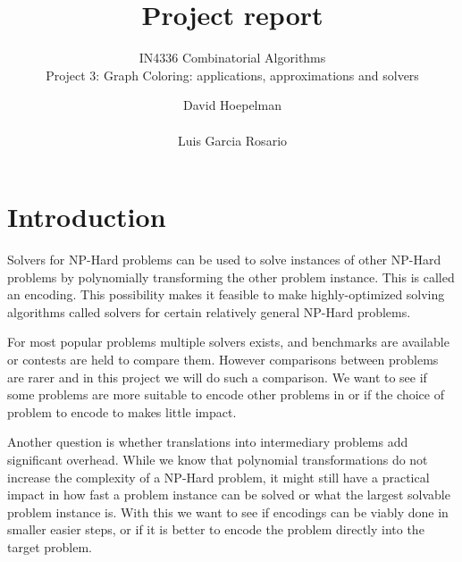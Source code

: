 \documentclass{sig-alternate}
\begin{document}
\title{Project report}

\subtitle{IN4336 Combinatorial Algorithms\\Project 3: Graph Coloring: applications, approximations and
solvers}


\author{
\alignauthor
David Hoepelman\\
       \\
\alignauthor
Luis Garcia Rosario\\
}

\maketitle


\begin{abstract}

\end{abstract}


\section{Introduction}

Solvers for NP-Hard problems can be used to solve instances of other NP-Hard problems by polynomially transforming the other problem instance. This is called an encoding.
This possibility makes it feasible to make highly-optimized solving algorithms called solvers for certain relatively general NP-Hard problems.

For most popular problems multiple solvers exists, and benchmarks are available or contests are held to compare them.
However comparisons between problems are rarer and in this project we will do such a comparison.
We want to see if some problems are more suitable to encode other problems in or if the choice of problem to encode to makes little impact.

Another question is whether translations into intermediary problems add significant overhead.
While we know that polynomial transformations do not increase the complexity of a NP-Hard problem, it might still have a practical impact in how fast a problem instance can be solved or what the largest solvable problem instance is.
With this we want to see if encodings can be viably done in smaller easier steps, or if it is better to encode the problem directly into the target problem.
\end{document}
